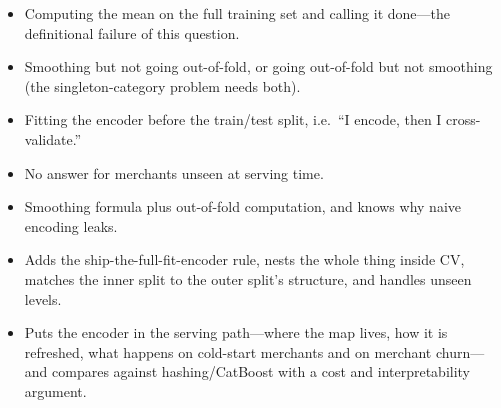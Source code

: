 \begin{interviewq}
\redflags
\begin{itemize}
    \item Computing the mean on the full training set and calling it done---the definitional failure of this question.
    \item Smoothing but not going out-of-fold, or going out-of-fold but not smoothing (the singleton-category problem needs both).
    \item Fitting the encoder before the train/test split, i.e.\ ``I encode, then I cross-validate.''
    \item No answer for merchants unseen at serving time.
\end{itemize}


\goodgreat
\begin{itemize}
    \item {} Smoothing formula plus out-of-fold computation, and knows why naive encoding leaks.
    \item {} Adds the ship-the-full-fit-encoder rule, nests the whole thing inside CV, matches the inner split to the outer split's structure, and handles unseen levels.
    \item {} Puts the encoder in the serving path---where the map lives, how it is refreshed, what happens on cold-start merchants and on merchant churn---and compares against hashing/CatBoost with a cost and interpretability argument.
\end{itemize}

\end{interviewq}

